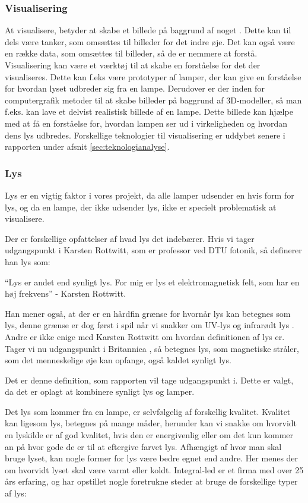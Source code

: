 \subsubsection{Visualisering}
At visualisere, betyder at skabe et billede på baggrund af noget \cite{ddo_visualisering}. Dette kan til dels være tanker, som omsættes til billeder for det indre øje. Det kan også være en række data, som omsættes til billeder, så de er nemmere at forstå.
Visualisering kan være et værktøj til at skabe en forståelse for det der visualiseres. Dette kan f.eks være prototyper af lamper, der kan give en forståelse for hvordan lyset udbreder sig fra en lampe. Derudover er der inden for computergrafik metoder til at skabe billeder på baggrund af 3D-modeller, så man f.eks. kan lave et delvist realistisk billede af en lampe. Dette billede kan hjælpe med at få en forståelse for, hvordan lampen ser ud i virkeligheden og hvordan dens lys udbredes. Forskellige teknologier til visualisering er uddybet senere i rapporten under afsnit \ref{sec:teknologianalyse}. 

\subsubsection{Lys}
Lys er en vigtig faktor i vores projekt, da alle lamper udsender en hvis form for lys, og da en lampe, der ikke udsender lys, ikke er specielt problematisk at visualisere.


Der er forskellige opfattelser af hvad lys det indebærer. Hvis vi tager udgangspunkt i Karsten Rottwitt, som er professor ved DTU fotonik, så definerer han lys som:

“Lys er andet end synligt lys. For mig er lys et elektromagnetisk felt, som har en høj frekvens”
- Karsten Rottwitt\cite{def_lys}.

Han mener også, at der er en hårdfin grænse for hvornår lys kan betegnes som lys, denne grænse er dog først i spil når vi snakker om UV-lys og infrarødt lys \cite{def_lys}. 
Andre er ikke enige med Karsten Rottwitt om hvordan definitionen af lys er. Tager vi nu udgangspunkt i Britannica \cite{britannica_lys}, så betegnes lys, som magnetiske stråler, som det menneskelige øje kan opfange, også kaldet synligt lys. 

Det er denne definition, som rapporten vil tage udgangspunkt i. Dette er valgt, da det er oplagt at kombinere synligt lys og lamper.

Det lys som kommer fra en lampe, er selvfølgelig af forskellig kvalitet. Kvalitet kan ligesom lys, betegnes på mange måder, herunder kan vi snakke om hvorvidt en lyskilde er af god kvalitet, hvis den er energivenlig eller om det kun kommer an på hvor gode de er til at eftergive farvet lys. 
Afhængigt af hvor man skal bruge lyset, kan nogle former for lys være bedre egnet end andre. Her menes der om hvorvidt lyset skal være varmt eller koldt. Integral-led er et firma med over 25 års erfaring\cite{integral_led}, og har opstillet nogle foretrukne steder at bruge de forskellige typer af lys:

